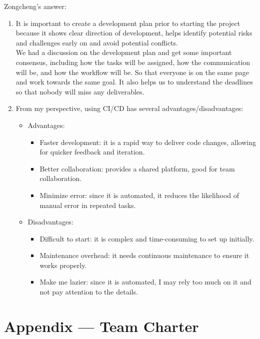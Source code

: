 \documentclass{article}
\begin{document}
Zongcheng's answer: \\
\begin{enumerate}
  \item It is important to create a development plan prior to starting the project because it shows clear direction of development, 
helps identify potential risks and challenges early on and avoid potential conflicts. \\
We had a discussion on the development plan and 
get some important consensus, including how the tasks will be assigned, how the communication will be, and how the workflow will be.
So that everyone is on the same page and work towards the same goal. It also helps us to understand the deadlines so that nobody will 
miss any deliverables.
  \item From my perspective, using CI/CD has several advantages/disadvantages:
  \begin{itemize}
    \item Advantages:
      \begin{itemize}
        \item Faster development: it is a rapid way to deliver code changes, allowing for quicker feedback and iteration.
        \item Better collaboration: provides a shared platform, good for team collaboration.
        \item Minimize error: since it is automated, it reduces the likelihood of manual error in repeated tasks.
      \end{itemize}
    \item Disadvantages:
      \begin{itemize}
        \item Difficult to start: it is complex and time-consuming to set up initially.
        \item Maintenance overhead: it needs continuous maintenance to ensure it works properly.
        \item Make me  lazier: since it is automated, I may rely too much on it and not pay attention to the details.
      \end{itemize}
  \end{itemize}
\end{enumerate}


\section*{Appendix --- Team Charter}

\end{document}
